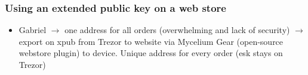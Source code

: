 \documentclass[english, 11pt]{article}
\begin{document}
\subsubsection{Using an extended public key on a web store}
\begin{itemize}
    \item Gabriel $\rightarrow$ one address for all orders (overwhelming and lack of security) $\rightarrow$ export on xpub from Trezor to website via Mycelium Gear (open-source webstore plugin) to device. Unique address for every order (esk stays on Trezor)
\end{itemize}
\end{document}
